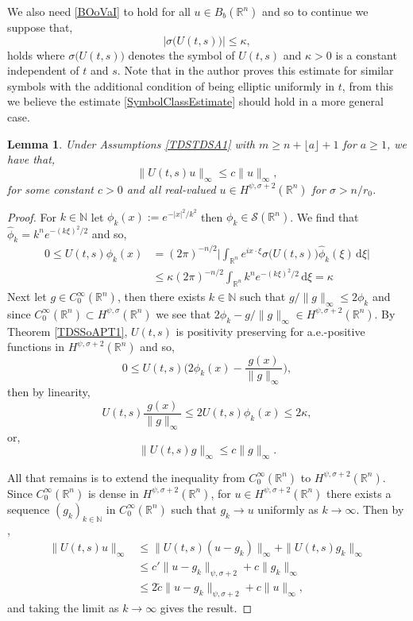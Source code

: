 \documentclass[a4paper, 12pt]{report}
\newtheorem{lemma}[theorem]{Lemma}
\theoremstyle{cor}
\theoremstyle{remark}
\theoremstyle{definition}
\begin{document}
We also need \eqref{BOoVaI} to hold for all $u \in B_b(\mathbb{R}^n)$ and so to continue we suppose that,
\begin{equation}
\big|\sigma\big(U(t, s)\big)\big| \le \kappa,\label{SymbolClassEstimate}
\end{equation}
holds where $\sigma\big(U(t, s)\big)$ denotes the symbol of $U(t, s)$ and $\kappa > 0$ is a constant independent of $t$ and $s$.  Note that in \cite{KernelPaper} the author proves this estimate for similar symbols with the additional condition of being elliptic uniformly in $t$, from this we believe the estimate \eqref{SymbolClassEstimate} should hold in a more general case.
\begin{lemma}\label{TDSSoAPL1.5}
Under Assumptions \ref{TDSTDSA1} with $m \ge n + \lfloor a \rfloor + 1$ for $a \ge 1$, we have that,
\begin{equation}
\|U(t, s)u\|_\infty \le c\|u\|_\infty,
\end{equation}
for some constant $c > 0$ and all real-valued $u \in H^{\psi, \sigma + 2}(\mathbb{R}^n)$ for $\sigma > n/r_0$.
\end{lemma}
\begin{proof}
For $k \in \mathbb{N}$ let $\phi_k(x) := e^{-|x|^2/k^2}$ then $\phi_k \in \mathcal{S}(\mathbb{R}^n)$.  We find that $\hat{\phi}_k = k^ne^{-(k\xi)^2/2}$ and so,
$$
\begin{aligned}
0 \le U(t, s)\phi_k(x) & = (2\pi)^{-n/2}\bigg|\int_{\mathbb{R}^n}e^{ix\cdot\xi}\sigma\big(U(t, s)\big)\hat{\phi}_k(\xi)\,\mathrm{d}\xi\bigg|\\
& \le \kappa(2\pi)^{-n/2}\int_{\mathbb{R}^n}k^ne^{-(k\xi)^2/2}\,\mathrm{d}\xi = \kappa
\end{aligned}
$$
Next let $g \in C_0^\infty(\mathbb{R}^n)$, then there exists $k \in \mathbb{N}$ such that $g/\|g\|_\infty \le 2\phi_k$ and since $C_0^\infty(\mathbb{R}^n) \subset H^{\psi, \sigma}(\mathbb{R}^n)$ we see that $2\phi_k - g/\|g\|_\infty \in H^{\psi, \sigma + 2}(\mathbb{R}^n)$.  By Theorem \ref{TDSSoAPT1}, $U(t, s)$ is positivity preserving for a.e.-positive functions in $H^{\psi, \sigma + 2}(\mathbb{R}^n)$ and so,
$$
0 \le U(t, s)\bigg(2\phi_k(x) - \frac{g(x)}{\|g\|_\infty}\bigg),
$$
then by linearity,
$$
U(t, s)\frac{g(x)}{\|g\|_\infty} \le 2U(t, s)\phi_k(x) \le 2\kappa,
$$
or,
$$
\|U(t, s)g\|_\infty \le c\|g\|_\infty.
$$

All that remains is to extend the inequality from $C_0^\infty(\mathbb{R}^n)$ to $H^{\psi, \sigma + 2}(\mathbb{R}^n)$.  Since $C_0^\infty(\mathbb{R}^n)$ is dense in $H^{\psi, \sigma + 2}(\mathbb{R}^n)$, for $u \in H^{\psi, \sigma + 2}(\mathbb{R}^n)$ there exists a sequence $(g_k)_{k \in \mathbb{N}}$ in $C_0^\infty(\mathbb{R}^n)$ such that $g_k \to u$ uniformly as $k \to \infty$.  Then by \cite[Section 7]{RZ},
$$
\begin{aligned}
\|U(t, s)u\|_\infty & \le \|U(t, s)(u - g_k)\|_\infty + \|U(t, s)g_k\|_\infty\\
& \le c'\|u - g_k\|_{\psi, \sigma + 2} + c\|g_k\|_\infty\\
& \le 2\tilde{c}\|u - g_k\|_{\psi, \sigma + 2} + c\|u\|_\infty,
\end{aligned}
$$
and taking the limit as $k \to \infty$ gives the result.
\end{proof}
\end{document}
